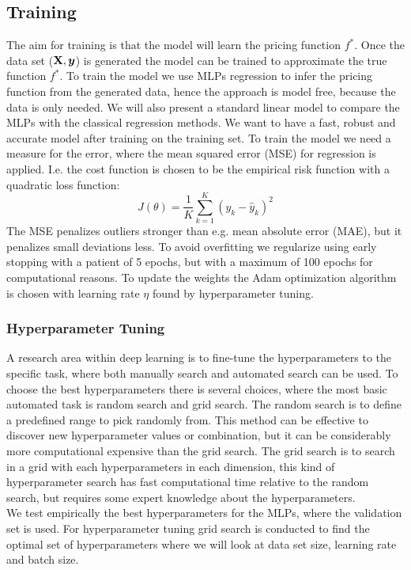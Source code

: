 \subsection{Training}\label{Training}
The aim for training is that the model will learn the pricing function $f^*$. Once the data set ($\mathbf{X}, \bm{y}$) is generated the model can be trained to approximate the true function $f^*$. To train the model we use MLPs regression to infer the pricing function from the generated data, hence the approach is model free, because the data is only needed. We will also present a standard linear model to compare the MLPs with the classical regression methods. We want to have a fast, robust and accurate model after training on the training set. To train the model we need a measure for the error, where the mean squared error (MSE) for regression is applied. I.e. the cost function is chosen to be the empirical risk function with a quadratic loss function:
$$J(\theta)= \frac{1}{K} \sum_{k=1}^{K}(y_k-\hat{y}_k)^2$$
The MSE penalizes outliers stronger than e.g. mean absolute error (MAE), but it penalizes small deviations less. To avoid overfitting we regularize using early stopping with a patient of 5 epochs, but with a maximum of 100 epochs for computational reasons. To update the weights the Adam optimization algorithm is chosen with learning rate $\eta$ found by hyperparameter tuning. \\

\subsubsection{Hyperparameter Tuning}
A research area within deep learning is to fine-tune the hyperparameters to the specific task, where both manually search and automated search can be used. To choose the best hyperparameters there is several choices, where the most basic automated task is random search and grid search. The random search is to define a predefined range to pick randomly from. This method can be effective to discover new hyperparameter values or combination, but it can be considerably more computational expensive than the grid search. The grid search is to search in a grid with each hyperparameters in each dimension, this kind of hyperparameter search has fast computational time relative to the random search, but requires some expert knowledge about the hyperparameters.\\

We test empirically the best hyperparameters for the MLPs, where the validation set is used. For hyperparameter tuning grid search is conducted to find the optimal set of hyperparameters where we will look at data set size, learning rate and batch size. \\

